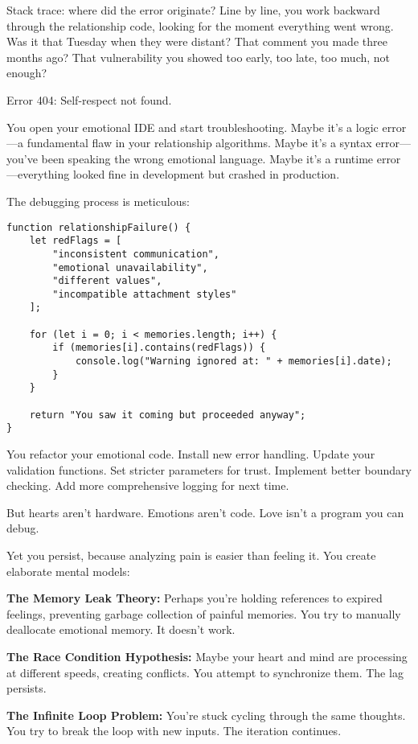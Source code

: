 \documentclass[12pt,letterpaper]{book}
\begin{document}
Stack trace: where did the error originate? Line by line, you work backward through the relationship code, looking for the moment everything went wrong. Was it that Tuesday when they were distant? That comment you made three months ago? That vulnerability you showed too early, too late, too much, not enough?

Error 404: Self-respect not found.

You open your emotional IDE and start troubleshooting. Maybe it's a logic error—a fundamental flaw in your relationship algorithms. Maybe it's a syntax error—you've been speaking the wrong emotional language. Maybe it's a runtime error—everything looked fine in development but crashed in production.

The debugging process is meticulous:

\begin{verbatim}
function relationshipFailure() {
    let redFlags = [
        "inconsistent communication",
        "emotional unavailability", 
        "different values",
        "incompatible attachment styles"
    ];
    
    for (let i = 0; i < memories.length; i++) {
        if (memories[i].contains(redFlags)) {
            console.log("Warning ignored at: " + memories[i].date);
        }
    }
    
    return "You saw it coming but proceeded anyway";
}
\end{verbatim}

You refactor your emotional code. Install new error handling. Update your validation functions. Set stricter parameters for trust. Implement better boundary checking. Add more comprehensive logging for next time.

But hearts aren't hardware. Emotions aren't code. Love isn't a program you can debug.

Yet you persist, because analyzing pain is easier than feeling it. You create elaborate mental models:

\textbf{The Memory Leak Theory:} Perhaps you're holding references to expired feelings, preventing garbage collection of painful memories. You try to manually deallocate emotional memory. It doesn't work.

\textbf{The Race Condition Hypothesis:} Maybe your heart and mind are processing at different speeds, creating conflicts. You attempt to synchronize them. The lag persists.

\textbf{The Infinite Loop Problem:} You're stuck cycling through the same thoughts. You try to break the loop with new inputs. The iteration continues.
\end{document}
